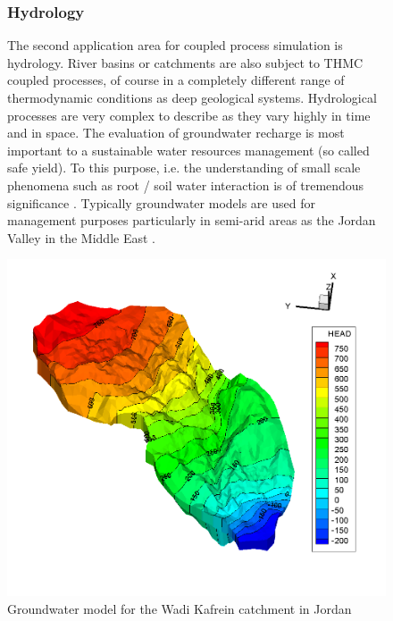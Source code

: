 \begin{figure}[!htb]
\begin{minipage}[t]{0.48\textwidth}
\subsubsection{Hydrology}

The second application area for coupled process simulation is hydrology. River basins or catchments are also subject to THMC coupled processes, of course in a completely different range of thermodynamic conditions as deep geological systems. Hydrological processes are very complex to describe as they vary highly in time and in space.
The evaluation of groundwater recharge is most important to a sustainable water resources management (so called safe yield).
To this purpose, i.e. the understanding of small scale phenomena such as root / soil water interaction is of tremendous significance \cite{KalEtAl2010}.
Typically groundwater models are used for management purposes particularly in semi-arid areas as the Jordan Valley in the Middle East \cite{WuEtAl:2011}.
\end{minipage}
\hspace{0.02\textwidth}
\begin{minipage}[t]{0.48\textwidth}
\vspace{1cm}
\includegraphics[scale=0.18]{figures/Steady_ContourMap}
\caption{Groundwater model for the Wadi Kafrein catchment in Jordan}
\label{fig:apl4}
\end{minipage}
\end{figure}

